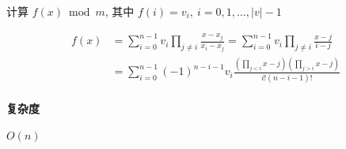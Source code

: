 计算 \(f(x) \bmod m\), 其中 \(f(i) = v_i,~i = 0,1,\dots,|v|-1\)

\[
    \begin{aligned}
        f(x) & =\sum_{i=0}^{n-1} v_i \prod_{j\ne i} \frac{x-x_j}{x_i-x_j}   =\sum_{i=0}^{n-1} v_i \prod_{j\ne i} \frac{x-j}{i-j} \\
             & =\sum_{i=0}^{n-1} (-1)^{n-i-1} v_i \frac{(\prod_{j<i} x-j)(\prod_{j>i} x-j)}{i!(n-i-1)!}
    \end{aligned}
\]

\paragraph{复杂度}

\(O(n)\)
